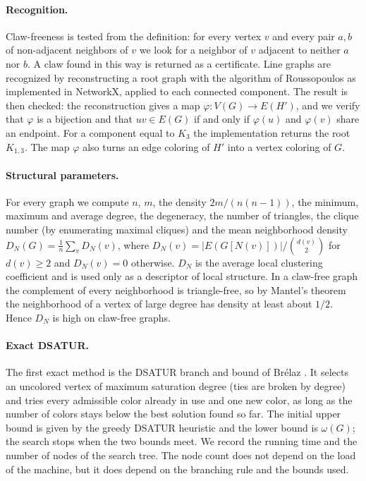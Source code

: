 \documentclass[11pt,a4paper]{article}
\begin{document}
\paragraph{Recognition.}
Claw-freeness is tested from the definition: for every vertex $v$ and every
pair $a,b$ of non-adjacent neighbors of $v$ we look for a neighbor of $v$
adjacent to neither $a$ nor $b$. A claw found in this way is returned as a
certificate. Line graphs are recognized by reconstructing a root graph with the
algorithm of Roussopoulos \cite{roussopoulos1973} as implemented in NetworkX,
applied to each connected component. The result is then checked: the
reconstruction gives a map $\varphi\colon V(G)\to E(H')$, and we verify that
$\varphi$ is a bijection and that $uv\in E(G)$ if and only if $\varphi(u)$ and
$\varphi(v)$ share an endpoint. For a component equal to $K_3$ the
implementation returns the root $K_{1,3}$. The map $\varphi$ also turns an edge
coloring of $H'$ into a vertex coloring of $G$.

\paragraph{Structural parameters.}
For every graph we compute $n$, $m$, the density $2m/(n(n-1))$, the minimum,
maximum and average degree, the degeneracy, the number of triangles, the clique
number (by enumerating maximal cliques) and the mean neighborhood density
$D_N(G)=\frac1{n}\sum_{v}D_N(v)$, where $D_N(v)=|E(G[N(v)])|/\binom{d(v)}{2}$
for $d(v)\ge 2$ and $D_N(v)=0$ otherwise. $D_N$ is the average local clustering
coefficient and is used only as a descriptor of local structure. In a
claw-free graph the complement of every neighborhood is triangle-free, so by
Mantel's theorem the neighborhood of a vertex of large degree has density
at least about $1/2$. Hence $D_N$ is high on claw-free graphs.

\paragraph{Exact DSATUR.}
The first exact method is the DSATUR branch and bound of Br\'elaz
\cite{brelaz1979}. It selects an uncolored vertex of maximum saturation degree
(ties are broken by degree) and tries every admissible color already in use
and one new color, as long as the number of colors stays below the best
solution found so far. The initial upper bound is given by the greedy DSATUR
heuristic and the lower bound is $\omega(G)$; the search stops when the two
bounds meet. We record the running time and the number of nodes of the search
tree. The node count does not depend on the load of the machine, but it does
depend on the branching rule and the bounds used.
\end{document}
